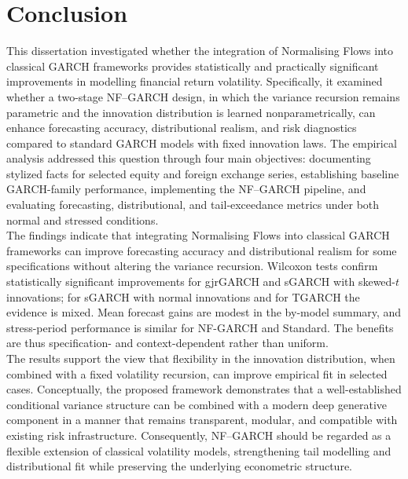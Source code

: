 \documentclass[oneside,12pt]{CUEDthesisPSnPDF}
\begin{document}

\section{Conclusion}
\noindent
This dissertation investigated whether the integration of Normalising Flows into classical GARCH frameworks provides statistically and practically significant improvements in modelling financial return volatility. Specifically, it examined whether a two-stage NF–GARCH design, in which the variance recursion remains parametric and the innovation distribution is learned nonparametrically, can enhance forecasting accuracy, distributional realism, and risk diagnostics compared to standard GARCH models with fixed innovation laws. The empirical analysis addressed this question through four main objectives: documenting stylized facts for selected equity and foreign exchange series, establishing baseline GARCH-family performance, implementing the NF–GARCH pipeline, and evaluating forecasting, distributional, and tail‑exceedance metrics under both normal and stressed conditions.\\

\medskip
\noindent
The findings indicate that integrating Normalising Flows into classical GARCH frameworks can improve forecasting accuracy and distributional realism for some specifications without altering the variance recursion. Wilcoxon tests confirm statistically significant improvements for gjrGARCH and sGARCH with skewed-$t$ innovations; for sGARCH with normal innovations and for TGARCH the evidence is mixed. Mean forecast gains are modest in the by-model summary, and stress-period performance is similar for NF-GARCH and Standard. The benefits are thus specification- and context-dependent rather than uniform.\\

\medskip
\noindent
The results support the view that flexibility in the innovation distribution, when combined with a fixed volatility recursion, can improve empirical fit in selected cases. Conceptually, the proposed framework demonstrates that a well-established conditional variance structure can be combined with a modern deep generative component in a manner that remains transparent, modular, and compatible with existing risk infrastructure. Consequently, NF–GARCH should be regarded as a flexible extension of classical volatility models, strengthening tail modelling and distributional fit while preserving the underlying econometric structure.\\
\end{document}
